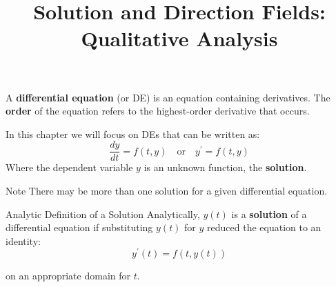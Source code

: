 \documentclass{beamer}
\title[Section 1.2]{Solution and Direction Fields: Qualitative Analysis}
\begin{document}
\begin{frame}
\titlepage
\end{frame}

\begin{frame}
\begin{block}{}
A \textbf{differential equation} (or DE) is an equation containing derivatives. The \textbf{order} of the equation refers to the highest-order derivative that occurs.\pause

\vspace{2mm}
In this chapter we will focus on DEs that can be written as:
\begin{equation*}
\dfrac{dy}{dt}=f(t,y)
\quad\text{or}\quad
y^{\prime}=f(t,y)
\end{equation*}
Where the dependent variable $y$ is an unknown function, the \textbf{solution}.
\end{block}\pause

\begin{block}{Note}
There may be more than one solution for a given differential equation.
\end{block}\pause

\begin{block}{Analytic Definition of a Solution}
Analytically, $y(t)$ is a \textbf{solution} of a differential equation if substituting $y(t)$ for $y$ reduced the equation to an identity:
\begin{equation*}
y^{\prime}(t)=f(t, y(t))
\end{equation*}

\vspace{-3mm}
on an appropriate domain for $t$.
\end{block}
\end{frame}
\end{document}
